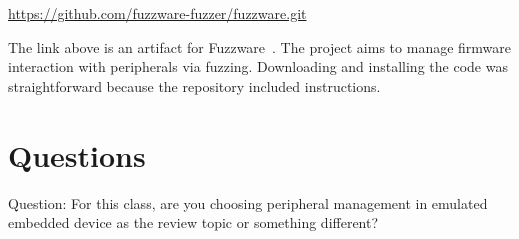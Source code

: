 \url{https://github.com/fuzzware-fuzzer/fuzzware.git}

The link above is an artifact for  Fuzzware~\cite{scharnowski2022fuzzware}. The project aims to manage firmware interaction with peripherals via fuzzing. Downloading and installing the code was straightforward because the repository included instructions.

\section{Questions}
Question: For this class, are you choosing peripheral management in emulated embedded device as the review topic or something different? 
\newline
\paragraph{}






%

